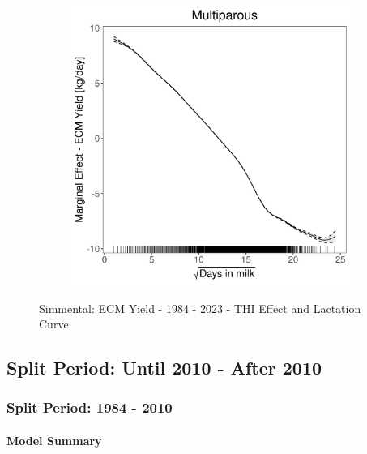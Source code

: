 \begin{figure}[H]
\begin{subfigure}[b]{0.45\textwidth}
    \end{subfigure}
    \hspace{0.05\textwidth} %
    \begin{subfigure}[b]{0.45\textwidth}
        \centering
        \includegraphics[width=\textwidth]{thesis/figures/models/ecm/full/si_ecm_full/si_ecm_full_marginal_dim_milk_multi.png}
    \end{subfigure}
    \caption[]{Simmental: ECM Yield - 1984 - 2023 - THI Effect and Lactation Curve}
    \label{fig:main}
\end{figure}

\subsection{Split Period: Until 2010 - After 2010}
\subsubsection{Split Period: 1984 - 2010}\label{model:si_ecm_before}

\paragraph{Model Summary} \quad \\


